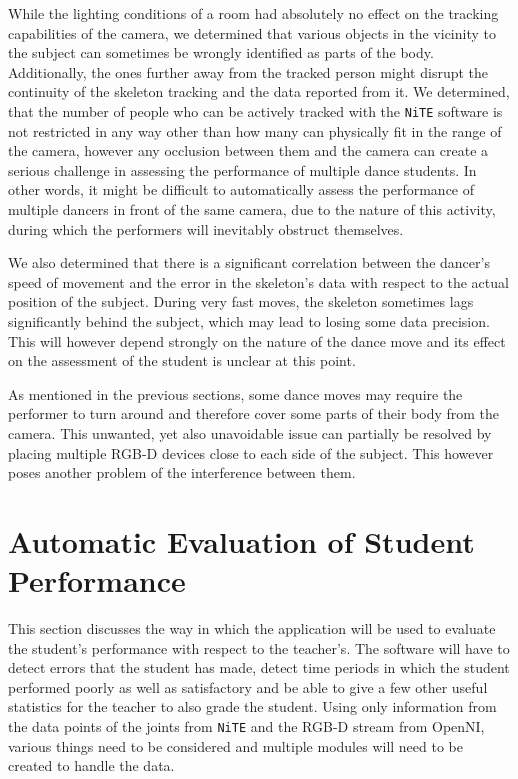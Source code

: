 \documentclass[10pt,a4paper]{article}
\begin{document}
\medskip \noindent While the lighting conditions of a room had absolutely no effect on the tracking capabilities of the camera, we determined that various objects in the vicinity to the subject can sometimes be wrongly identified as parts of the body. Additionally, the ones further away from the tracked person might disrupt the continuity of the skeleton tracking and the data reported from it. We determined, that the number of people who can be actively tracked with the \texttt{NiTE} software is not restricted in any way other than how many can physically fit in the range of the camera, however any occlusion between them and the camera can create a serious challenge in assessing the performance of multiple dance students. In other words, it might be difficult to automatically assess the performance of multiple dancers in front of the same camera, due to the nature of this activity, during which the performers will inevitably obstruct themselves.

\medskip \noindent We also determined that there is a significant correlation between the dancer's speed of movement and the error in the skeleton's data with respect to the actual position of the subject. During very fast moves, the skeleton sometimes lags significantly behind the subject, which may lead to losing some data precision. This will however depend strongly on the nature of the dance move and its effect on the assessment of the student is unclear at this point.

\medskip \noindent As mentioned in the previous sections, some dance moves may require the performer to turn around and therefore cover some parts of their body from the camera. This unwanted, yet also unavoidable issue can partially be resolved by placing multiple RGB-D devices close to each side of the subject. This however poses another problem of the interference between them. %

\clearpage

\section{Automatic Evaluation of Student Performance}
\noindent
This section discusses the way in which the application will be used to evaluate the student's performance with respect to the teacher's. The software will have to detect errors that the student has made, detect time periods in which the student performed poorly as well as satisfactory and be able to give a few other useful statistics for the teacher to also grade the student. Using only information from the data points of the joints from \texttt{NiTE} and the RGB-D stream from OpenNI, various things need to be considered and multiple modules will need to be created to handle the data. 
\end{document}
